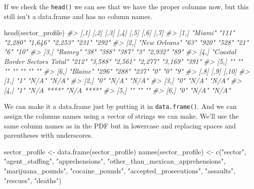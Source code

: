 \documentclass[
]{krantz}
\makeatletter
\newenvironment{Shaded}{\begin{snugshade}}{\end{snugshade}}
\newcommand{\CommentTok}[1]{\textcolor[rgb]{0.37,0.37,0.37}{\textit{#1}}}
\newcommand{\FunctionTok}[1]{\textcolor[rgb]{0,0,0}{#1}}
\newcommand{\NormalTok}[1]{#1}
\newcommand{\OtherTok}[1]{\textcolor[rgb]{0.37,0.37,0.37}{#1}}
\newcommand{\StringTok}[1]{\textcolor[rgb]{0.5,0.5,0.5}{#1}}
\newenvironment{kframe}{%
\medskip{}
\setlength{\fboxsep}{.8em}
 \def\at@end@of@kframe{}%
 \ifinner\ifhmode%
  \def\at@end@of@kframe{\end{minipage}}%
  \begin{minipage}{\columnwidth}%
 \fi\fi%
 \def\FrameCommand##1{\hskip\@totalleftmargin \hskip-\fboxsep
 \colorbox{shadecolor}{##1}\hskip-\fboxsep
     \hskip-\linewidth \hskip-\@totalleftmargin \hskip\columnwidth}%
 \MakeFramed {\advance\hsize-\width
   \@totalleftmargin\z@ \linewidth\hsize
   \@setminipage}}%
 {\par\unskip\endMakeFramed%
 \at@end@of@kframe}
\renewenvironment{Shaded}{\begin{kframe}}{\end{kframe}}
\makeatother
\begin{document}
If we check the \texttt{head()} we can see that we have the proper columns now, but this still isn't a data.frame and has no column names.

\begin{Shaded}
\begin{Highlighting}[]
\FunctionTok{head}\NormalTok{(sector\_profile)}
\CommentTok{\#\textgreater{}      [,1]                           [,2]  [,3]    [,4]    [,5]    [,6]    [,7] }
\CommentTok{\#\textgreater{} [1,] "Miami"                        "111" "2,280" "1,646" "2,253" "231"   "292"}
\CommentTok{\#\textgreater{} [2,] "New Orleans"                  "63"  "920"   "528"   "21"    "6"     "10" }
\CommentTok{\#\textgreater{} [3,] "Ramey"                        "38"  "388"   "387"   "3"     "2,932" "89" }
\CommentTok{\#\textgreater{} [4,] "Coastal Border Sectors Total" "212" "3,588" "2,561" "2,277" "3,169" "391"}
\CommentTok{\#\textgreater{} [5,] ""                             ""    ""      ""      ""      ""      ""   }
\CommentTok{\#\textgreater{} [6,] "Blaine"                       "296" "288"   "237"   "0"     "0"     "9"  }
\CommentTok{\#\textgreater{}      [,8] [,9]       [,10]     }
\CommentTok{\#\textgreater{} [1,] "1"  "N/A"      "N/A"     }
\CommentTok{\#\textgreater{} [2,] "0"  "N/A"      "N/A"     }
\CommentTok{\#\textgreater{} [3,] "0"  "N/A"      "N/A"     }
\CommentTok{\#\textgreater{} [4,] "1"  "N/A ****" "N/A ****"}
\CommentTok{\#\textgreater{} [5,] ""   ""         ""        }
\CommentTok{\#\textgreater{} [6,] "0"  "N/A"      "N/A"}
\end{Highlighting}
\end{Shaded}

We can make it a data.frame just by putting it in \texttt{data.frame()}. And we can assign the columns names using a vector of strings we can make. We'll use the same column names as in the PDF but in lowercase and replacing spaces and parentheses with underscores.

\begin{Shaded}
\begin{Highlighting}[]
\NormalTok{sector\_profile }\OtherTok{\textless{}{-}} \FunctionTok{data.frame}\NormalTok{(sector\_profile)}
\FunctionTok{names}\NormalTok{(sector\_profile) }\OtherTok{\textless{}{-}} \FunctionTok{c}\NormalTok{(}\StringTok{"sector"}\NormalTok{,}
                           \StringTok{"agent\_staffing"}\NormalTok{,}
                           \StringTok{"apprehensions"}\NormalTok{,}
                           \StringTok{"other\_than\_mexican\_apprehensions"}\NormalTok{, }
                           \StringTok{"marijuana\_pounds"}\NormalTok{,}
                           \StringTok{"cocaine\_pounds"}\NormalTok{,}
                           \StringTok{"accepted\_prosecutions"}\NormalTok{,}
                           \StringTok{"assaults"}\NormalTok{,}
                           \StringTok{"rescues"}\NormalTok{,}
                           \StringTok{"deaths"}\NormalTok{)}
\end{Highlighting}
\end{Shaded}
\end{document}
